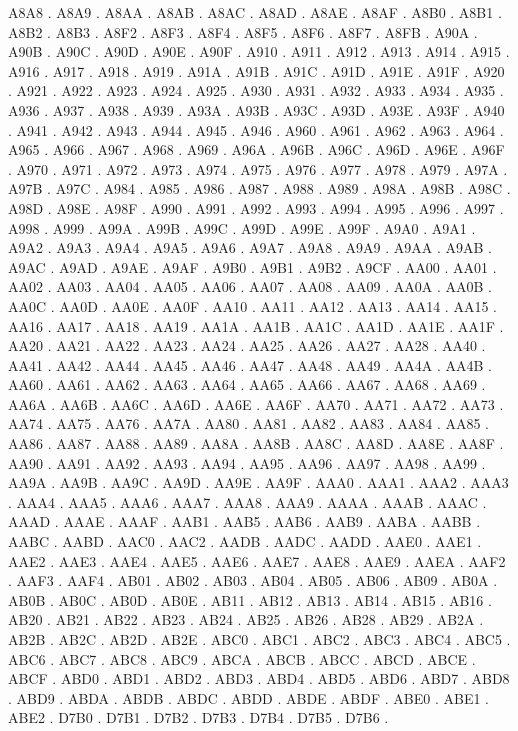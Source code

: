 A8A8 .
A8A9 .
A8AA .
A8AB .
A8AC .
A8AD .
A8AE .
A8AF .
A8B0 .
A8B1 .
A8B2 .
A8B3 .
A8F2 .
A8F3 .
A8F4 .
A8F5 .
A8F6 .
A8F7 .
A8FB .
A90A .
A90B .
A90C .
A90D .
A90E .
A90F .
A910 .
A911 .
A912 .
A913 .
A914 .
A915 .
A916 .
A917 .
A918 .
A919 .
A91A .
A91B .
A91C .
A91D .
A91E .
A91F .
A920 .
A921 .
A922 .
A923 .
A924 .
A925 .
A930 .
A931 .
A932 .
A933 .
A934 .
A935 .
A936 .
A937 .
A938 .
A939 .
A93A .
A93B .
A93C .
A93D .
A93E .
A93F .
A940 .
A941 .
A942 .
A943 .
A944 .
A945 .
A946 .
A960 .
A961 .
A962 .
A963 .
A964 .
A965 .
A966 .
A967 .
A968 .
A969 .
A96A .
A96B .
A96C .
A96D .
A96E .
A96F .
A970 .
A971 .
A972 .
A973 .
A974 .
A975 .
A976 .
A977 .
A978 .
A979 .
A97A .
A97B .
A97C .
A984 .
A985 .
A986 .
A987 .
A988 .
A989 .
A98A .
A98B .
A98C .
A98D .
A98E .
A98F .
A990 .
A991 .
A992 .
A993 .
A994 .
A995 .
A996 .
A997 .
A998 .
A999 .
A99A .
A99B .
A99C .
A99D .
A99E .
A99F .
A9A0 .
A9A1 .
A9A2 .
A9A3 .
A9A4 .
A9A5 .
A9A6 .
A9A7 .
A9A8 .
A9A9 .
A9AA .
A9AB .
A9AC .
A9AD .
A9AE .
A9AF .
A9B0 .
A9B1 .
A9B2 .
A9CF .
AA00 .
AA01 .
AA02 .
AA03 .
AA04 .
AA05 .
AA06 .
AA07 .
AA08 .
AA09 .
AA0A .
AA0B .
AA0C .
AA0D .
AA0E .
AA0F .
AA10 .
AA11 .
AA12 .
AA13 .
AA14 .
AA15 .
AA16 .
AA17 .
AA18 .
AA19 .
AA1A .
AA1B .
AA1C .
AA1D .
AA1E .
AA1F .
AA20 .
AA21 .
AA22 .
AA23 .
AA24 .
AA25 .
AA26 .
AA27 .
AA28 .
AA40 .
AA41 .
AA42 .
AA44 .
AA45 .
AA46 .
AA47 .
AA48 .
AA49 .
AA4A .
AA4B .
AA60 .
AA61 .
AA62 .
AA63 .
AA64 .
AA65 .
AA66 .
AA67 .
AA68 .
AA69 .
AA6A .
AA6B .
AA6C .
AA6D .
AA6E .
AA6F .
AA70 .
AA71 .
AA72 .
AA73 .
AA74 .
AA75 .
AA76 .
AA7A .
AA80 .
AA81 .
AA82 .
AA83 .
AA84 .
AA85 .
AA86 .
AA87 .
AA88 .
AA89 .
AA8A .
AA8B .
AA8C .
AA8D .
AA8E .
AA8F .
AA90 .
AA91 .
AA92 .
AA93 .
AA94 .
AA95 .
AA96 .
AA97 .
AA98 .
AA99 .
AA9A .
AA9B .
AA9C .
AA9D .
AA9E .
AA9F .
AAA0 .
AAA1 .
AAA2 .
AAA3 .
AAA4 .
AAA5 .
AAA6 .
AAA7 .
AAA8 .
AAA9 .
AAAA .
AAAB .
AAAC .
AAAD .
AAAE .
AAAF .
AAB1 .
AAB5 .
AAB6 .
AAB9 .
AABA .
AABB .
AABC .
AABD .
AAC0 .
AAC2 .
AADB .
AADC .
AADD .
AAE0 .
AAE1 .
AAE2 .
AAE3 .
AAE4 .
AAE5 .
AAE6 .
AAE7 .
AAE8 .
AAE9 .
AAEA .
AAF2 .
AAF3 .
AAF4 .
AB01 .
AB02 .
AB03 .
AB04 .
AB05 .
AB06 .
AB09 .
AB0A .
AB0B .
AB0C .
AB0D .
AB0E .
AB11 .
AB12 .
AB13 .
AB14 .
AB15 .
AB16 .
AB20 .
AB21 .
AB22 .
AB23 .
AB24 .
AB25 .
AB26 .
AB28 .
AB29 .
AB2A .
AB2B .
AB2C .
AB2D .
AB2E .
ABC0 .
ABC1 .
ABC2 .
ABC3 .
ABC4 .
ABC5 .
ABC6 .
ABC7 .
ABC8 .
ABC9 .
ABCA .
ABCB .
ABCC .
ABCD .
ABCE .
ABCF .
ABD0 .
ABD1 .
ABD2 .
ABD3 .
ABD4 .
ABD5 .
ABD6 .
ABD7 .
ABD8 .
ABD9 .
ABDA .
ABDB .
ABDC .
ABDD .
ABDE .
ABDF .
ABE0 .
ABE1 .
ABE2 .
D7B0 .
D7B1 .
D7B2 .
D7B3 .
D7B4 .
D7B5 .
D7B6 .
